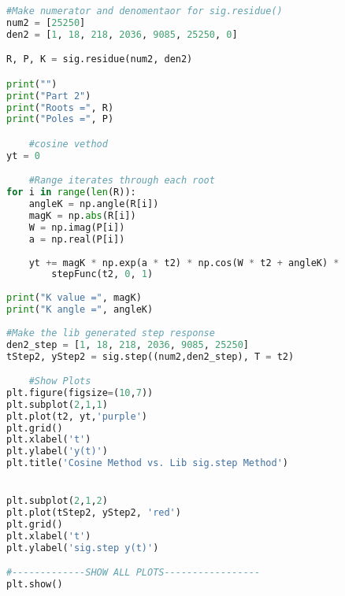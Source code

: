 \documentclass[12pt,a4paper]{article}
\begin{document}
\begin{lstlisting}[language=Python]
    #Make numerator and denomentaor for sig.residue()
num2 = [25250]
den2 = [1, 18, 218, 2036, 9085, 25250, 0]

R, P, K = sig.residue(num2, den2)

print("")
print("Part 2")
print("Roots =", R)
print("Poles =", P)

    #cosine vethod
yt = 0

    #Range iterates through each root
for i in range(len(R)):
    angleK = np.angle(R[i])
    magK = np.abs(R[i])
    W = np.imag(P[i])
    a = np.real(P[i])
        
    yt += magK * np.exp(a * t2) * np.cos(W * t2 + angleK) * 
        stepFunc(t2, 0, 1)
    
print("K value =", magK)
print("K angle =", angleK)
    
#Make the lib generated step response
den2_step = [1, 18, 218, 2036, 9085, 25250]
tStep2, yStep2 = sig.step((num2,den2_step), T = t2)

    #Show Plots
plt.figure(figsize=(10,7))
plt.subplot(2,1,1)
plt.plot(t2, yt,'purple')
plt.grid()
plt.xlabel('t')
plt.ylabel('y(t)')
plt.title('Cosine Method vs. Lib sig.step Method')


plt.subplot(2,1,2)
plt.plot(tStep2, yStep2, 'red')
plt.grid()
plt.xlabel('t')
plt.ylabel('sig.step y(t)')

#-------------SHOW ALL PLOTS-----------------
plt.show()
\end{lstlisting}
\end{document}
